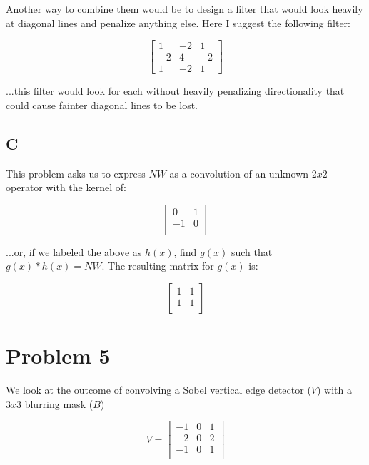 \documentclass{article}
\begin{document}
Another way to combine them would be to design a filter that would look heavily at diagonal lines and penalize anything else. Here I suggest the following filter:

\begin{equation}
    \begin{bmatrix}
        1 & -2 & 1 \\
        -2 & 4 & -2 \\
        1 & -2 & 1
    \end{bmatrix}
\end{equation}

...this filter would look for each without heavily penalizing directionality that could cause fainter diagonal lines to be lost.

\subsection*{C}

This problem asks us to express $NW$ as a convolution of an unknown $2x2$ operator with the kernel of:

\begin{equation}
    \begin{bmatrix}
        0 & 1 \\
        -1 & 0 \\
    \end{bmatrix}
\end{equation}

\noindent ...or, if we labeled the above as $h(x)$, find $g(x)$ such that $g(x)*h(x) = NW$. The resulting matrix for $g(x)$ is:

\begin{equation}
    \begin{bmatrix}
        1 & 1 \\
        1 & 1 \\
    \end{bmatrix}
\end{equation}

\section*{Problem 5}

We look at the outcome of convolving a Sobel vertical edge detector ($V$) with a $3x3$ blurring mask ($B$)

\begin{equation}
    V = \begin{bmatrix}
        -1 & 0 & 1 \\
        -2 & 0 & 2 \\
        -1 & 0 & 1 \\
    \end{bmatrix}
\end{equation}
\end{document}
